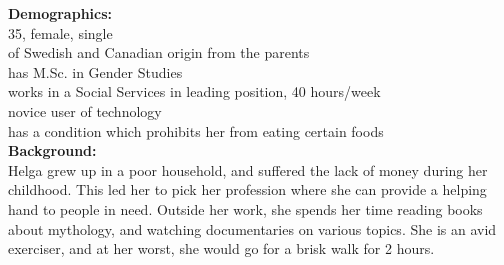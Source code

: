 \documentclass[a4paper,10pt,oneside]{scrreprt}
\begin{document}
		\begin{mdframed}
			\begin{minipage}{\textwidth}
				\begin{figure}
					\centering
					\vspace{-4cm}
				\end{figure}


				\textbf{Demographics:}\\
				35, female, single\\
				of Swedish and Canadian origin from the parents\\
				has M.Sc. in Gender Studies\\
				works in a Social Services in leading position, 40 hours/week\\
				novice user of technology\\
				has a condition which prohibits her from eating certain foods\\

				\textbf{Background:}\\
				Helga grew up in a poor household, and suffered the lack of money during her childhood. This led her to pick her profession where she can provide a helping hand to people in need. Outside her work, she spends her time reading books about mythology, and watching documentaries on various topics. She is an avid exerciser, and at her worst, she would go for a brisk walk for 2 hours.\\





\end{minipage}
\end{mdframed}
\end{document}
